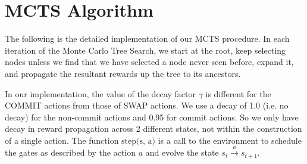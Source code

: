 \section{\label{appendix:mcts}MCTS Algorithm}

The following is the detailed implementation of our MCTS procedure. In each iteration of the Monte Carlo Tree Search, we start at the root, keep selecting nodes unless we find that we have selected a node never seen before, expand it, and propagate the resultant rewards up the tree to its ancestors.

In our implementation, the value of the decay factor $\gamma$ is different for the COMMIT actions from those of SWAP actions. We use a decay of 1.0 (i.e. no decay) for the non-commit actions and 0.95 for commit actions. So we only have decay in reward propagation across 2 different states, not within the construction of a single action. The function $\textrm{step(s, a)}$ is a call to the environment to schedule the gates as described by the action $a$ and evolve the state $s_{t} \xrightarrow[]{a} s_{t+1}$.

